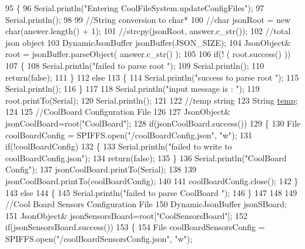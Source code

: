 \begin{DoxyCode}
95 \{
96     Serial.println(\textcolor{stringliteral}{"Entering CoolFileSystem.updateConfigFiles"});
97     Serial.println();
98 
99     \textcolor{comment}{//String conversion to char*}
100     \textcolor{comment}{//char jsonRoot = new char(answer.length() + 1);}
101     \textcolor{comment}{//strcpy(jsonRoot, answer.c\_str());}
102     \textcolor{comment}{//total json object }
103     DynamicJsonBuffer jsonBuffer(JSON\_SIZE);
104     JsonObject& root = jsonBuffer.parseObject( answer.c\_str() );
105     
106     \textcolor{keywordflow}{if}(! ( root.success() ))
107     \{
108         Serial.println(\textcolor{stringliteral}{"failed to parse root "});
109         Serial.println();
110         \textcolor{keywordflow}{return}(\textcolor{keyword}{false});
111     \}
112     \textcolor{keywordflow}{else}
113     \{
114         Serial.println(\textcolor{stringliteral}{"success to parse root "});
115         Serial.println();   
116     \}
117     
118     Serial.println(\textcolor{stringliteral}{"input message is : "});
119     root.printTo(Serial);
120     Serial.println();
121 
122     \textcolor{comment}{//temp string}
123     String \hyperlink{Irene3000_8h_a5905d48604152cf57aa6bfa087b49173}{temp};
124 
125     \textcolor{comment}{//CoolBoard Configuration File}
126 
127         JsonObject& jsonCoolBoard=root[\textcolor{stringliteral}{"CoolBoard"}];
128     \textcolor{keywordflow}{if}(jsonCoolBoard.success())
129     \{
130         File coolBoardConfig = SPIFFS.open(\textcolor{stringliteral}{"/coolBoardConfig.json"}, \textcolor{stringliteral}{"w"});   
131         \textcolor{keywordflow}{if}(!coolBoardConfig)
132         \{   
133             Serial.println(\textcolor{stringliteral}{"failed to write to coolBoardConfig.json"});
134             \textcolor{keywordflow}{return}(\textcolor{keyword}{false});
135         \}
136         Serial.println(\textcolor{stringliteral}{"CoolBoard Config"});
137         jsonCoolBoard.printTo(Serial);
138         
139         jsonCoolBoard.printTo(coolBoardConfig);
140         
141         coolBoardConfig.close();
142     \}
143     \textcolor{keywordflow}{else}
144     \{
145         Serial.println(\textcolor{stringliteral}{"failed to parse CoolBoard "});
146     \}       
147 
148     
149     \textcolor{comment}{//Cool Board Sensors Configuration File}
150     DynamicJsonBuffer jsonSBoard;
151         JsonObject& jsonSensorsBoard=root[\textcolor{stringliteral}{"CoolSensorsBoard"}];  
152     \textcolor{keywordflow}{if}(jsonSensorsBoard.success())
153     \{   
154         File coolBoardSensorsConfig = SPIFFS.open(\textcolor{stringliteral}{"/coolBoardSensorsConfig.json"}, \textcolor{stringliteral}{"w"}); 

\end{DoxyCode}
